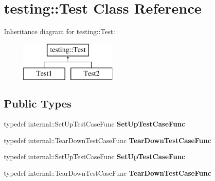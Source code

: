 \hypertarget{classtesting_1_1_test}{}\section{testing\+:\+:Test Class Reference}
\label{classtesting_1_1_test}
Inheritance diagram for testing\+:\+:Test\+:\begin{figure}[H]
\begin{center}
\leavevmode
\includegraphics[height=2.000000cm]{classtesting_1_1_test}
\end{center}
\end{figure}
\subsection*{Public Types}
\begin{DoxyCompactItemize}
\item 
\hypertarget{classtesting_1_1_test_a5f2a051d1d99c9b784c666c586186cf9}{}typedef internal\+::\+Set\+Up\+Test\+Case\+Func {\bfseries Set\+Up\+Test\+Case\+Func}\label{classtesting_1_1_test_a5f2a051d1d99c9b784c666c586186cf9}

\item 
\hypertarget{classtesting_1_1_test_aa0f532e93b9f3500144c53f31466976c}{}typedef internal\+::\+Tear\+Down\+Test\+Case\+Func {\bfseries Tear\+Down\+Test\+Case\+Func}\label{classtesting_1_1_test_aa0f532e93b9f3500144c53f31466976c}

\item 
\hypertarget{classtesting_1_1_test_a5f2a051d1d99c9b784c666c586186cf9}{}typedef internal\+::\+Set\+Up\+Test\+Case\+Func {\bfseries Set\+Up\+Test\+Case\+Func}\label{classtesting_1_1_test_a5f2a051d1d99c9b784c666c586186cf9}

\item 
\hypertarget{classtesting_1_1_test_aa0f532e93b9f3500144c53f31466976c}{}typedef internal\+::\+Tear\+Down\+Test\+Case\+Func {\bfseries Tear\+Down\+Test\+Case\+Func}\label{classtesting_1_1_test_aa0f532e93b9f3500144c53f31466976c}

\end{DoxyCompactItemize}

